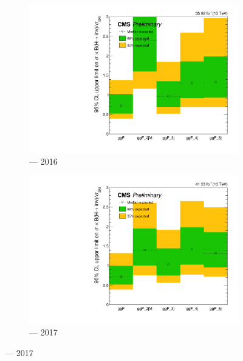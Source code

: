 \begin{figure}[htbp]
    \centering
    \begin{subfigure}[b]{0.45\textwidth}
        \includegraphics[width=\textwidth]{figures/limits/ggF/limit_2016_ggF_Scenario4.pdf}
        \caption{\ggH --- 2016}
    \end{subfigure}
    \hfill
    \begin{subfigure}[b]{0.45\textwidth}
        \includegraphics[width=\textwidth]{figures/limits/ggF/limit_2017_ggF_Scenario4.pdf}
        \caption{\ggH --- 2017}
    \end{subfigure}


\end{figure}

